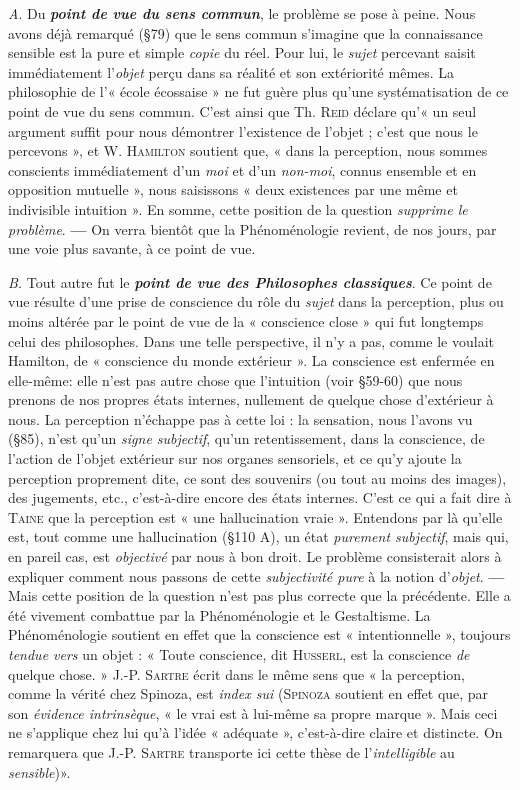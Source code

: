 {\it A}. Du \textbf{\textit {point de vue du sens commun}}, le problème se pose
à peine. Nous avons déjà remarqué (\S 79) que le sens commun s’imagine
que la connaissance sensible est la pure et simple {\it copie} du réel.
Pour lui, le {\it sujet} percevant saisit immédiatement l’{\it objet} perçu dans
sa réalité et son extériorité mêmes. La philosophie de l’« école écossaise »
ne fut guère plus qu’une systématisation de ce point de vue
du sens commun. C’est ainsi que Th. \textsc{Reid} déclare qu'« un seul
argument suffit pour nous démontrer l’existence de l’objet ; c’est
que nous le percevons », et W. \textsc{Hamilton} soutient que, « dans la
perception, nous sommes conscients immédiatement d’un {\it moi} et
d’un {\it non-moi}, connus ensemble et en opposition mutuelle », nous
saisissons « deux existences par une même et indivisible intuition ».
En somme, cette position de la question {\it supprime le problème}. {\bf —}
On verra bientôt que la Phénoménologie revient, de nos jours, par
une voie plus savante, à ce point de vue.

{\it B.} Tout autre fut le \textbf{\textit {point de vue des Philosophes classiques}}.
Ce point de vue résulte d’une prise de conscience du rôle du {\it sujet}
dans la perception, plus ou moins altérée par le point de vue de la
« conscience close » qui fut longtemps celui des philosophes. Dans une
telle perspective, il n’y a pas, comme le voulait Hamilton, de « conscience
du monde extérieur ». La conscience est enfermée en elle-même:
elle n’est pas autre chose que l’intuition (voir \S 59-60) que nous
prenons de nos propres états internes, nullement de quelque chose
d’extérieur à nous. La perception n’échappe pas à cette loi : la sensation,
nous l’avons vu (\S 85), n’est qu’un {\it signe subjectif}, qu’un retentissement,
dans la conscience, de l’action de l’objet extérieur sur nos
organes sensoriels, et ce qu’y ajoute la perception proprement dite,
ce sont des souvenirs (ou tout au moins des images), des jugements, etc.,
c’est-à-dire encore des états internes. C’est ce qui a fait dire à \textsc{Taine}
que la perception est « une hallucination vraie ». Entendons par là
qu’elle est, tout comme une hallucination (\S 110 A), un état {\it purement
subjectif}, mais qui, en pareil cas, est {\it objectivé} par nous à bon droit.
Le problème consisterait alors à expliquer comment nous passons
de cette {\it subjectivité pure} à la notion d'{\it objet}. {\bf —} Mais cette position
de la question n’est pas plus correcte que la précédente. Elle a été
vivement combattue par la Phénoménologie et le Gestaltisme. La
Phénoménologie soutient en effet que la conscience est « intentionnelle »,
toujours {\it tendue vers} un objet : « Toute conscience, dit \textsc{Husserl},
est la conscience {\it de} quelque chose. » J.-P. \textsc{Sartre} écrit dans le même
sens que « la perception, comme la vérité chez Spinoza, est {\it index sui}
{\scriptsize (\textsc{Spinoza} soutient en effet que, par son {\it évidence intrinsèque}, « le vrai est à lui-même
sa propre marque ». Mais ceci ne s'applique chez lui qu'à l’idée « adéquate », c’est-à-dire
claire et distincte. On remarquera que J.-P. \textsc{Sartre} transporte ici cette thèse de l’{\it intelligible} au {\it sensible})}».

